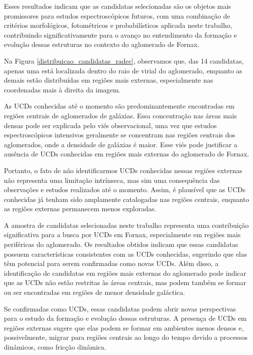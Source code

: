 Esses resultados indicam que as candidatas selecionadas são os objetos mais promissores para estudos espectroscópicos futuros, com uma combinação de critérios morfológicos, fotométricos e probabilísticos aplicada neste trabalho, contribuindo significativamente para o avanço no entendimento da formação e evolução dessas estruturas no contexto do aglomerado de Fornax.

Na Figura \ref{distribuicao_candidatas_radec}, observamos que, das 14 candidatas, apenas uma está localizada dentro do raio de virial do aglomerado, enquanto as demais estão distribuídas em regiões mais externas, especialmente nas coordenadas mais à direita da imagem.

As UCDs conhecidas até o momento são predominantemente encontradas em regiões centrais de aglomerados de galáxias. Essa concentração nas áreas mais densas pode ser explicada pelo viés observacional, uma vez que estudos espectroscópicos intensivos geralmente se concentram nas regiões centrais dos aglomerados, onde a densidade de galáxias é maior. Esse viés pode justificar a ausência de UCDs conhecidas em regiões mais externas do aglomerado de Fornax.

Portanto, o fato de não identificarmos UCDs conhecidas nessas regiões externas não representa uma limitação intrínseca, mas sim uma consequência das observações e estudos realizados até o momento. Assim, é plausível que as UCDs conhecidas já tenham sido amplamente catalogadas nas regiões centrais, enquanto as regiões externas permanecem menos exploradas.

A amostra de candidatas selecionadas neste trabalho representa uma contribuição significativa para a busca por UCDs em Fornax, especialmente em regiões mais periféricas do aglomerado. Os resultados obtidos indicam que essas candidatas possuem características consistentes com as UCDs conhecidas, sugerindo que elas têm potencial para serem confirmadas como novas UCDs. Além disso, a identificação de candidatas em regiões mais externas do aglomerado pode indicar que as UCDs não estão restritas às áreas centrais, mas podem também se formar ou ser encontradas em regiões de menor densidade galáctica.

Se confirmadas como UCDs, essas candidatas podem abrir novas perspectivas para o estudo da formação e evolução dessas estruturas. A presença de UCDs em regiões externas sugere que elas podem se formar em ambientes menos densos e, possivelmente, migrar para regiões centrais ao longo do tempo devido a processos dinâmicos, como fricção dinâmica. 

